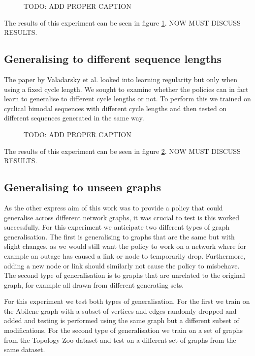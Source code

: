 \begin{figure}
    \centering
    
    \caption{TODO: ADD PROPER CAPTION}
    \label{fig:exp_cyclic}
\end{figure}

The results of this experiment can be seen in figure \ref{fig:exp_cyclic}. NOW MUST DISCUSS RESULTS.

\subsection{Generalising to different sequence lengths}
The paper by Valadarsky et al. looked into learning regularity but only when using a fixed cycle length. We sought to examine whether the policies can in fact learn to generalise to different cycle lengths or not. To perform this we trained on cyclical bimodal sequences with different cycle lengths and then tested on different sequences generated in the same way.

\begin{figure}
    \centering
    
    \caption{TODO: ADD PROPER CAPTION}
    \label{fig:exp_vary}
\end{figure}

The results of this experiment can be seen in figure \ref{fig:exp_vary}. NOW MUST DISCUSS RESULTS.

\subsection{Generalising to unseen graphs}
As the other express aim of this work was to provide a policy that could generalise across different network graphs, it was crucial to test is this worked successfully. For this experiment we anticipate two different types of graph generalisation. The first is generalising to graphs that are the same but with slight changes, as we would still want the policy to work on a network where for example an outage has caused a link or node to temporarily drop. Furthermore, adding a new node or link should similarly not cause the policy to misbehave. The second type of generalisation is to graphs that are unrelated to the original graph, for example all drawn from different generating sets.

For this experiment we test both types of generalisation. For the first we train on the Abilene graph with a subset of vertices and edges randomly dropped and added and testing is performed using the same graph but a different subset of modifications. For the second type of generalisation we train on a set of graphs from the Topology Zoo dataset and test on a different set of graphs from the same dataset.

